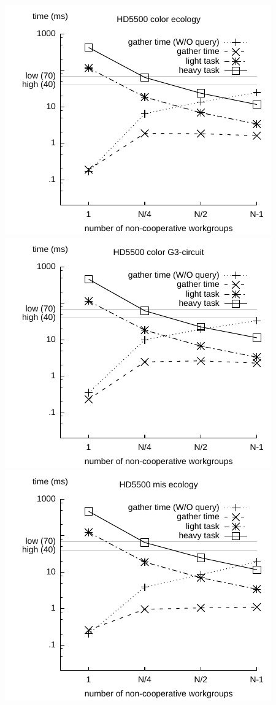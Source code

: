 \documentclass[parskip=half,sigconf,review, anonymous=true, acmcopyrightmode=none]{acmart}
\begin{document}
\includegraphics[width=.7\columnwidth]{images/barrier/hd5500_color_ecology.pdf} \\
\includegraphics[width=.7\columnwidth]{images/barrier/hd5500_color_G3_circuit.pdf} \\
\includegraphics[width=.7\columnwidth]{images/barrier/hd5500_mis_ecology.pdf} \\
\end{document}
